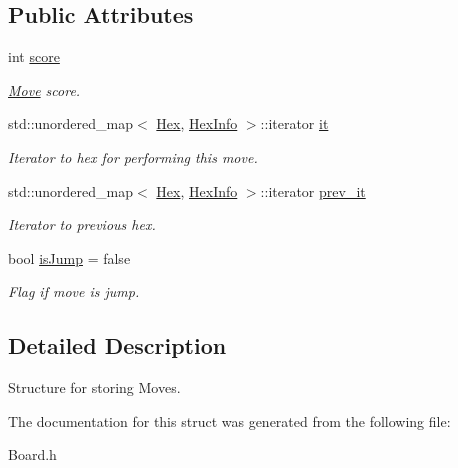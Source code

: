 \subsection*{Public Attributes}
\begin{DoxyCompactItemize}
\item 
int \hyperlink{structMove_a5317736c5694bec3a8b7209245dd285c}{score}\hypertarget{structMove_a5317736c5694bec3a8b7209245dd285c}{}\label{structMove_a5317736c5694bec3a8b7209245dd285c}

\begin{DoxyCompactList}\small\item\em \hyperlink{structMove}{Move} score. \end{DoxyCompactList}\item 
std\+::unordered\+\_\+map$<$ \hyperlink{classHex}{Hex}, \hyperlink{structHexInfo}{Hex\+Info} $>$\+::iterator \hyperlink{structMove_aa0b9cdf923e5ad6e2dbb530e022b3bad}{it}\hypertarget{structMove_aa0b9cdf923e5ad6e2dbb530e022b3bad}{}\label{structMove_aa0b9cdf923e5ad6e2dbb530e022b3bad}

\begin{DoxyCompactList}\small\item\em Iterator to hex for performing this move. \end{DoxyCompactList}\item 
std\+::unordered\+\_\+map$<$ \hyperlink{classHex}{Hex}, \hyperlink{structHexInfo}{Hex\+Info} $>$\+::iterator \hyperlink{structMove_a26c6ef8f57d5c09a7d8460e845c03d51}{prev\+\_\+it}\hypertarget{structMove_a26c6ef8f57d5c09a7d8460e845c03d51}{}\label{structMove_a26c6ef8f57d5c09a7d8460e845c03d51}

\begin{DoxyCompactList}\small\item\em Iterator to previous hex. \end{DoxyCompactList}\item 
bool \hyperlink{structMove_a31f71f0cf3d843dc596beab63597adbd}{is\+Jump} = false\hypertarget{structMove_a31f71f0cf3d843dc596beab63597adbd}{}\label{structMove_a31f71f0cf3d843dc596beab63597adbd}

\begin{DoxyCompactList}\small\item\em Flag if move is jump. \end{DoxyCompactList}\end{DoxyCompactItemize}


\subsection{Detailed Description}
Structure for storing Moves. 

The documentation for this struct was generated from the following file\+:\begin{DoxyCompactItemize}
\item 
Board.\+h\end{DoxyCompactItemize}
